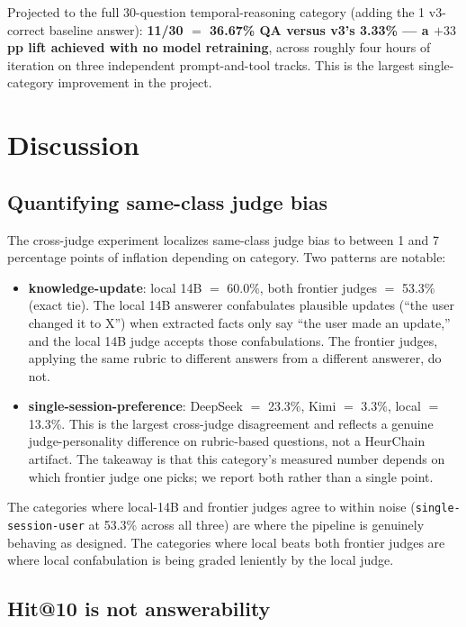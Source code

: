 \documentclass{article}
\begin{document}
Projected to the full 30-question temporal-reasoning category (adding the 1 v3-correct baseline answer): \textbf{11/30 $=$ 36.67\% QA versus v3's 3.33\% --- a $+33$\,pp lift achieved with no model retraining}, across roughly four hours of iteration on three independent prompt-and-tool tracks. This is the largest single-category improvement in the project.

\section{Discussion}
\label{sec:discussion}

\subsection{Quantifying same-class judge bias}

The cross-judge experiment localizes same-class judge bias to between 1 and 7 percentage points of inflation depending on category. Two patterns are notable:

\begin{itemize}
  \item \textbf{knowledge-update}: local 14B $=$ 60.0\%, both frontier judges $=$ 53.3\% (exact tie). The local 14B answerer confabulates plausible updates (``the user changed it to X'') when extracted facts only say ``the user made an update,'' and the local 14B judge accepts those confabulations. The frontier judges, applying the same rubric to different answers from a different answerer, do not.
  \item \textbf{single-session-preference}: DeepSeek $=$ 23.3\%, Kimi $=$ 3.3\%, local $=$ 13.3\%. This is the largest cross-judge disagreement and reflects a genuine judge-personality difference on rubric-based questions, not a HeurChain artifact. The takeaway is that this category's measured number depends on which frontier judge one picks; we report both rather than a single point.
\end{itemize}

The categories where local-14B and frontier judges agree to within noise (\texttt{single-session-user} at 53.3\% across all three) are where the pipeline is genuinely behaving as designed. The categories where local beats both frontier judges are where local confabulation is being graded leniently by the local judge.

\subsection{Hit@10 is not answerability}
\end{document}
